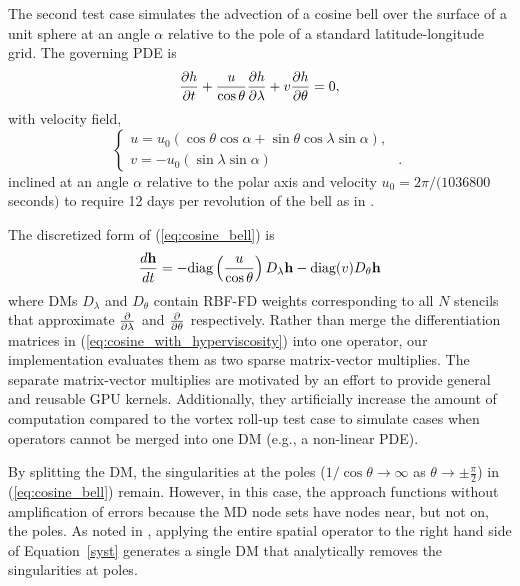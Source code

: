\documentclass{report}
\begin{document}
The second test case simulates the advection of a cosine bell over the surface of a unit sphere at an angle $\alpha$ relative to the pole of a standard latitude-longitude grid. The governing PDE is
\begin{equation}
\frac{\partial h}{\partial t} + \frac{u}{\cos \theta} \frac{\partial h}{\partial \lambda} + v \frac{\partial h}{\partial \theta} = 0, \label{eq:cosine_bell}
\end{equation}
with velocity field,
\begin{equation*}
\begin{cases}
u =  u_0 (\cos \theta \cos \alpha + \sin \theta \cos \lambda \sin \alpha),  & \\
v =  -u_0(\sin \lambda \sin \alpha) &.
\end{cases}
\end{equation*}
inclined at an angle $\alpha$ relative to the polar axis and velocity $u_0 = 2 \pi / (1036800$ seconds$)$ to require 12 days per revolution of the bell as in \cite{NairTransport05, FlyerWright07}.

The discretized form of (\ref{eq:cosine_bell}) is
\begin{equation}
\frac{d \mathbf{h}}{d t} = -\text{diag}\left(\frac{u}{\cos \theta}\right) D_\lambda \mathbf{h} - \text{diag}(v) D_\theta \mathbf{h}
\label{eq:cosine_with_hyperviscosity}
\end{equation}
where DMs $D_\lambda$ and $D_\theta$ contain RBF-FD weights corresponding to all $N$ stencils that approximate $\frac{\partial }{\partial \lambda}$ and $\frac{\partial }{\partial \theta}$ respectively. Rather than merge the differentiation matrices in (\ref{eq:cosine_with_hyperviscosity}) into one operator, our implementation evaluates them as two sparse matrix-vector multiplies. The separate matrix-vector multiplies are motivated by an effort to provide general and reusable GPU kernels. Additionally, they artificially increase the amount of computation compared to the vortex roll-up test case to simulate cases when operators cannot be merged into one DM (e.g., a non-linear PDE).

By splitting the DM, the singularities at the poles ($1 / \cos{\theta} \rightarrow \infty$ as $\theta \rightarrow \pm\frac{\pi}{2}$) in (\ref{eq:cosine_bell}) remain. However, in this case, the approach functions without amplification of errors because the MD node sets have nodes near, but not on, the poles. As noted in \cite{FlyerWright07, FornbergLehto11}, applying the entire spatial operator to the right hand side of Equation~\ref{syst} generates a single DM that analytically removes the singularities at poles. 
\end{document}
